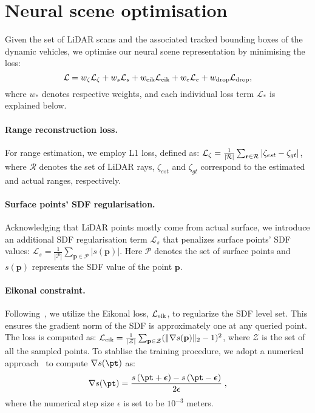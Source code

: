 \section{Neural scene optimisation} \label{sec:optmisation}
Given the set of LiDAR scans and the associated tracked bounding boxes of the dynamic vehicles, we optimise our neural scene representation by minimising the loss:
\begin{equation}
    \mathcal{L} = w_{\zeta} \mathcal{L}_{\zeta} +  w_{s} \mathcal{L}_{s} + w_{\text{eik}} \mathcal{L}_{\text{eik}} + w_{e} \mathcal{L}_{e} + w_{\text{drop}} \mathcal{L}_{\text{drop}},
    \label{loss}
\end{equation}
where $w_{*}$ denotes respective weights, and each individual loss term $\mathcal{L}_*$ is explained below.


\paragraph{Range reconstruction loss.}
For range estimation, we employ L1 loss, defined as: $\mathcal{L}_{\zeta} = \frac{1}{|\mathcal{R}|}\sum_{\mathbf{r} \in \mathcal{R}}|\zeta_{est} -\zeta_{gt}|$, where $\mathcal{R}$ denotes the set of LiDAR rays, $\zeta_{est}$ and $\zeta_{gt}$ correspond to the estimated and actual ranges, respectively. 


\paragraph{Surface points' SDF regularisation.} \label{sec:surfacesdf}
Acknowledging that LiDAR points mostly come from actual surface, we introduce an additional SDF regularisation term $\mathcal{L}_{s}$ that penalizes surface points' SDF values: $\mathcal{L}_{s} = \frac{1}{|\mathcal{P}|}\sum_{\mathbf{p} \in \mathcal{P}}|s(\mathbf{p})|$. Here $\mathcal{P}$ denotes the set of surface points and $s({\mathbf{p}})$ represents the SDF value of the point $\mathbf{p}$.


\paragraph{Eikonal constraint.}
Following~\cite{icml2020_2086}, we utilize the Eikonal loss, $\mathcal{L}_{\text{eik}}$, to regularize the SDF level set. This ensures the gradient norm of the SDF is approximately one at any queried point. The loss is computed as: $\mathcal{L}_{\text{eik}} = \frac{1}{|\mathcal{Z}|} \sum_{\mathbf{p} \in \mathcal{Z}}( \| \nabla s(\mathbf{p}) \|_2 - 1)^2$, where $\mathcal{Z}$ is the set of all the sampled points. To stablise the training procedure, we adopt a numerical approach~\cite{li2023neuralangelo} to compute $\nabla s(\pt)$ as: 
\begin{equation}
    \nabla s(\pt) = \frac{s \left( \pt + \boldsymbol{\epsilon} \right) - s \left(\pt - \boldsymbol{\epsilon} \right)}{2 \epsilon} \;,
    \label{eqn:central_diff_normal}
\end{equation}
where the numerical step size $\epsilon$ is set to be $10^{-3}$ meters.


